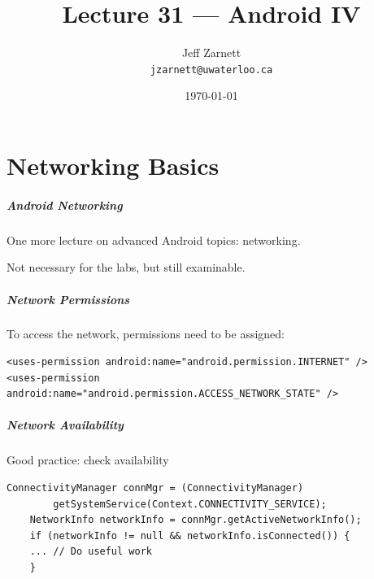 

\title{Lecture 31 --- Android IV}

\author{Jeff Zarnett \\ \small \texttt{jzarnett@uwaterloo.ca}}
\date{\today}




\begin{frame}
  \titlepage
\end{frame}

\part{Networking Basics}
\frame{\partpage}

\begin{frame}
\frametitle{Android Networking}

\begin{changemargin}{1cm}
One more lecture on advanced Android topics: networking.

Not necessary for the labs, but still examinable.

\end{changemargin}
\end{frame}

\begin{frame}[fragile]
\frametitle{Network Permissions}

\begin{changemargin}{1cm}
To access the network, permissions need to be assigned:
\end{changemargin}
{\scriptsize
\begin{verbatim}
<uses-permission android:name="android.permission.INTERNET" />
<uses-permission android:name="android.permission.ACCESS_NETWORK_STATE" />
\end{verbatim}
}
\end{frame}

\begin{frame}[fragile]
\frametitle{Network Availability}

\begin{changemargin}{1cm}
Good practice: check availability
{\scriptsize
\begin{verbatim}
ConnectivityManager connMgr = (ConnectivityManager) 
        getSystemService(Context.CONNECTIVITY_SERVICE);
    NetworkInfo networkInfo = connMgr.getActiveNetworkInfo();
    if (networkInfo != null && networkInfo.isConnected()) {
    ... // Do useful work
    }
\end{verbatim}
}
\end{changemargin}
\end{frame}

